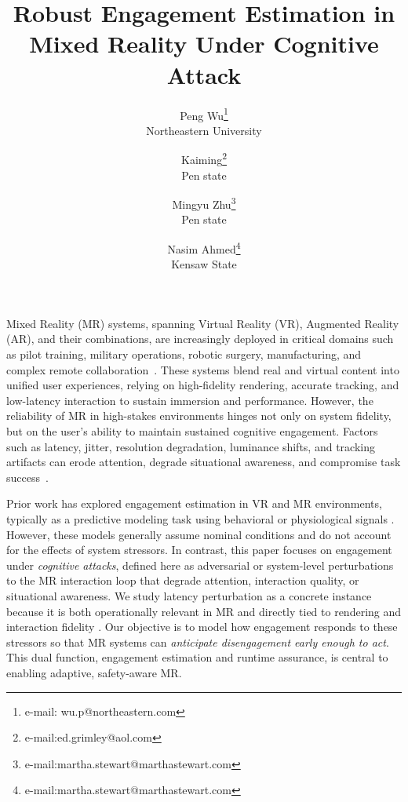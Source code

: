 \documentclass[review]{vgtc}                 %
\title{Robust Engagement Estimation in Mixed Reality Under Cognitive Attack}
\author{Peng Wu\thanks{e-mail: wu.p@northeastern.com}\\ %
        \scriptsize Northeastern University %
\and Kaiming\thanks{e-mail:ed.grimley@aol.com}\\ %
     \scriptsize Pen state %
\and Mingyu Zhu\thanks{e-mail:martha.stewart@marthastewart.com}\\ %
     \scriptsize Pen state
 \and Nasim Ahmed\thanks{e-mail:martha.stewart@marthastewart.com}\\ %
     \scriptsize Kensaw State
     }
\newif\ifprintcomments
\newcommand{\gtan}[1]{
    \ifprintcomments
        \textcolor{blue}{[\textbf{GT:} #1]}
    \fi}
\begin{document}
\maketitle
Mixed Reality (MR) systems, spanning Virtual Reality (VR), Augmented Reality (AR), and their combinations, are increasingly deployed in critical domains such as pilot training, military operations, robotic surgery, manufacturing, and complex remote collaboration~\cite{falola2024role}. These systems blend real and virtual content into unified user experiences, relying on high-fidelity rendering, accurate tracking, and low-latency interaction to sustain immersion and performance. However, the reliability of MR in high-stakes environments hinges not only on system fidelity, but on the user’s ability to maintain sustained cognitive engagement. Factors such as latency, jitter, resolution degradation, luminance shifts, and tracking artifacts can erode attention, degrade situational awareness, and compromise task success~\cite{li2025benefits, gruen2020measuring}.

Prior work has explored engagement estimation in VR and MR environments, typically as a predictive modeling task using behavioral or physiological signals \cite{garro2025neurophysiological, adhanom2023eye}. 
However, these models generally assume nominal conditions and do not account for the effects of system stressors. In contrast, this paper focuses on engagement under \emph{cognitive attacks}, defined here as adversarial or system-level perturbations to the MR interaction loop that degrade attention, interaction quality, or situational awareness. We study latency perturbation as a concrete instance because it is both operationally relevant in MR and directly tied to rendering and interaction fidelity \cite{chen2025neurosymbolic, cheng2023exploring}. Our objective is to model how engagement responds to these stressors so that MR systems can \emph{anticipate disengagement early enough to act}. This dual function, engagement estimation and runtime assurance, is central to enabling adaptive, safety-aware MR.
\end{document}
